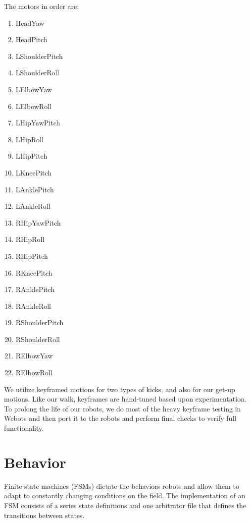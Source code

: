 \documentclass{article}
\begin{document}
  	The motors in order are:
	  \begin{multicols}{3}
		  \begin{enumerate}
			  \item HeadYaw
  			\item HeadPitch
	  		\item LShoulderPitch
		  	\item LShoulderRoll
			  \item LElbowYaw
  			\item LElbowRoll
	  		\item LHipYawPitch
		  	\item LHipRoll
			  \item LHipPitch
  			\item LKneePitch
	  		\item LAnklePitch
		  	\item LAnkleRoll
			  \item RHipYawPitch
  			\item RHipRoll
	  		\item RHipPitch
		  	\item RKneePitch
			  \item RAnklePitch
  			\item RAnkleRoll
	  		\item RShoulderPitch
		  	\item RShoulderRoll
			  \item RElbowYaw
  			\item RElbowRoll
	  	\end{enumerate}
  	\end{multicols}

	  We utilize keyframed motions for two types of kicks, and also for our get-up motions. Like our walk, keyframes are hand-tuned based upon experimentation. To prolong the life of our robots, we do most of the heavy keyframe testing in Webots and then port it to the robots and perform final checks to verify full functionality.



\section{Behavior}
	Finite state machines (FSMs) dictate the behaviors robots and allow them to adapt to constantly changing conditions on the field.  The implementation of an FSM consists of a series state definitions and one arbitrator file that defines the transitions between states. 
\end{document}
